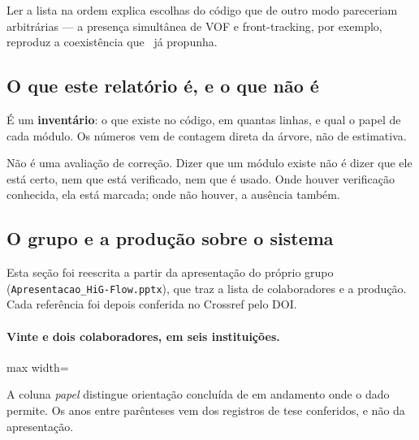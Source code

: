 Ler a lista na ordem explica escolhas do c\'odigo que de outro modo pareceriam
arbitr\'arias --- a presen\c{c}a simult\^anea de VOF e front-tracking, por
exemplo, reproduz a coexist\^encia que~\cite{sousa2004} j\'a propunha.

\subsection{O que este relat\'orio \'e, e o que n\~ao \'e}

\'E um \textbf{invent\'ario}: o que existe no c\'odigo, em quantas linhas, e qual
o papel de cada m\'odulo. Os n\'umeros vem de contagem direta da \'arvore, n\~ao
de estimativa.

N\~ao \'e uma avalia\c{c}\~ao de corre\c{c}\~ao. Dizer que um m\'odulo existe
n\~ao \'e dizer que ele est\'a certo, nem que est\'a verificado, nem que \'e
usado. Onde houver verifica\c{c}\~ao conhecida, ela est\'a marcada; onde n\~ao
houver, a aus\^encia tamb\'em.

\subsection{O grupo e a produ\c{c}\~ao sobre o sistema}

Esta se\c{c}\~ao foi reescrita a partir da apresenta\c{c}\~ao do pr\'oprio grupo
(\texttt{Apresentacao\_\allowbreak{}Hi\allowbreak{}G-\allowbreak{}Flow.\allowbreak{}pptx}), que traz a lista de colaboradores e a
produ\c{c}\~ao. Cada refer\^encia foi depois conferida no Crossref pelo DOI.

\paragraph{Vinte e dois colaboradores, em seis institui\c{c}\~oes.}\mbox{}

\begin{adjustbox}{max width=\linewidth}
\end{adjustbox}

A coluna \emph{papel} distingue orienta\c{c}\~ao conclu\'ida de em andamento
onde o dado permite. Os anos entre par\^enteses vem dos registros de tese
conferidos, e n\~ao da apresenta\c{c}\~ao.

